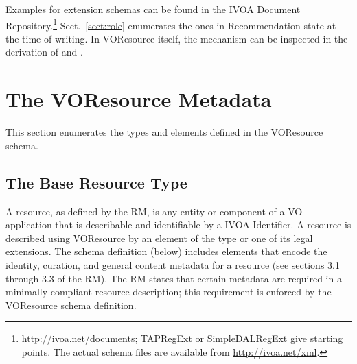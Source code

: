 \documentclass[11pt,a4paper]{ivoa}
\begin{document}
Examples for extension schemas can be found in the IVOA Document
Repository.\footnote{\url{http://ivoa.net/documents}; TAPRegExt or
SimpleDALRegExt give starting points.  The actual schema files are
available from \url{http://ivoa.net/xml}.}
Sect.~\ref{sect:role} enumerates the ones in Recommendation state at the
time of writing.  In VOResource itself, the mechanism can be inspected
in the derivation of  and .


\section{The VOResource Metadata}
\label{sect:metadata}


This section enumerates the types and elements defined in the
VOResource schema.


\subsection{The Base Resource Type}

\label{sect:restype}

A resource, as defined by the RM, is any entity or component of a VO
application that is describable and identifiable by a IVOA Identifier.
A resource is described using VOResource by an element of the type
 or one of its legal extensions.  The schema
definition (below) includes elements that encode the identity, curation,
and general content metadata for a resource (see sections 3.1 through
3.3 of the RM).  The RM states that certain metadata are required in a
minimally compliant resource description; this requirement is enforced
by the VOResource schema definition.  

\goodbreak
\end{document}
